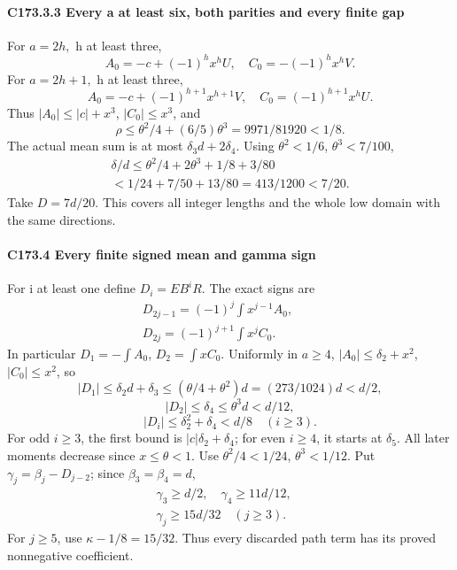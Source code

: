 \paragraph{C173.3.3 Every a at least six, both parities and every finite gap}

For \(a=2h,\allowbreak \) h at least three,
\[
A_0=-c+(-1)^h x^hU,\quad C_0=-(-1)^h x^hV.
\]
For \(a=2h+1,\allowbreak \) h at least three,
\[
A_0=-c+(-1)^{h+1}x^{h+1}V,\quad
C_0=(-1)^{h+1}x^hU.
\]
Thus \(|A_0|\le|c|+x^3\), \(|C_0|\le x^3\), and
\[
\rho\le\theta^2/4+(6/5)\theta^3=9971/81920<1/8.
\]
The actual mean sum is at most \(\delta_3d+2\delta_4\). Using \(\theta^2<1/6\), \(\theta^3<7/100\),
\[
\begin{gathered}
\delta/d\le\theta^2/4+2\theta^3+1/8+3/80\\
<1/24+7/50+13/80=413/1200<7/20.
\end{gathered}\tag{C173.T183.14}
\]
Take \(D=7d/20\). This covers all integer lengths and the whole low domain with the same directions.

\paragraph{C173.4 Every finite signed mean and gamma sign}

For i at least one define \(D_i=EB^iR.\) The exact signs are
\[
\begin{gathered}
D_{2j-1}=(-1)^j\int x^{j-1}A_0,\qquad\\
D_{2j}=(-1)^{j+1}\int x^jC_0.
\end{gathered}\tag{C173.T183.15}
\]
In particular \(D_1=-\int A_0\), \(D_2=\int xC_0\). Uniformly in \(a\ge4\), \(|A_0|\le \delta_2+x^2\), \(|C_0|\le x^2\), so
\[
|D_1|\le \delta_2d+\delta_3
\le(\theta/4+\theta^2)d=(273/1024)d<d/2,
\]
\[
|D_2|\le \delta_4\le\theta^3d<d/12,
\]
\[
|D_i|\le \delta_2^2+\delta_4<d/8\quad(i\ge3).                \tag{C173.T183.16}
\]
For odd \(i\ge3\), the first bound is \(|c|\delta_2+\delta_4\); for even \(i\ge4\), it starts at \(\delta_5\). All later moments decrease since \(x\le\theta<1\). Use \(\theta^2/4<1/24\), \(\theta^3<1/12\). Put \(\gamma_j=\beta_j-D_{j-2}\); since \(\beta_3=\beta_4=d\),
\[
\begin{gathered}
\gamma_3\ge d/2,\quad\gamma_4\ge11d/12,\quad\\
\boxed{\gamma_j\ge15d/32\quad(j\ge3).}
\end{gathered}\tag{C173.T183.17}
\]
For \(j\ge5\), use \(\kappa-1/8=15/32\). Thus every discarded path term has its proved nonnegative coefficient.

